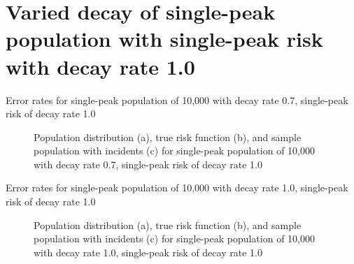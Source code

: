 \section{Varied decay of single-peak population with single-peak risk with decay rate 1.0}
\label{sec:app:results_pX_100_1.0_1h}

\graphicspath{{./results/p0.7_100_1.0_1h/}}
\makeatletter
{}
\makeatother

\begin{table}[H]
    
    \caption[]{Error rates for single-peak population of 10,000 with decay rate 0.7, single-peak risk of decay rate 1.0}
    \label{tab:mean_error_rates:p0.7_100_1.0_1h}
\end{table}

\begin{figure}[H]
    
    \caption[]{Population distribution (a), true risk function (b), and sample population with incidents (c) for single-peak population of 10,000 with decay rate 0.7, single-peak risk of decay rate 1.0}
    \label{fig:distributions:p0.7_100_1.0_1h}    
\end{figure}

\graphicspath{{./results/p1.0_100_1.0_1h/}}
\makeatletter
{}
\makeatother

\begin{table}[H]
    
    \caption[]{Error rates for single-peak population of 10,000 with decay rate 1.0, single-peak risk of decay rate 1.0}
    \label{tab:mean_error_rates:p1.0_100_1.0_1h}
\end{table}

\begin{figure}[H]
    
    \caption[]{Population distribution (a), true risk function (b), and sample population with incidents (c) for single-peak population of 10,000 with decay rate 1.0, single-peak risk of decay rate 1.0}
    \label{fig:distributions:p1.0_100_1.0_1h}    
\end{figure}

\graphicspath{{./results/p1.4_100_1.0_1h/}}
\makeatletter
{}
\makeatother

